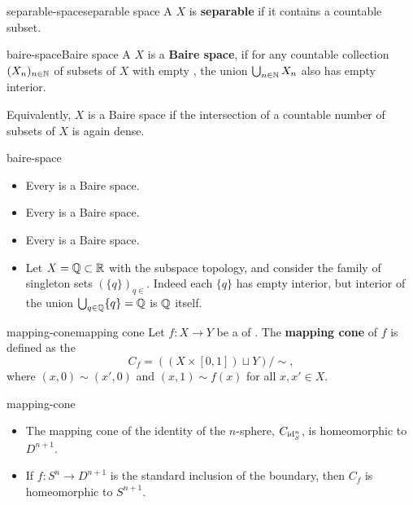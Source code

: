 \begin{topic}{separable-space}{separable space}
    A  $X$ is \textbf{separable} if it contains a countable  subset.
\end{topic}

\begin{topic}{baire-space}{Baire space}
    A  $X$ is a \textbf{Baire space}, if for any countable collection $(X_n)_{n \in \mathbb{N}}$ of subsets of $X$ with empty , the union $\bigcup_{n \in \mathbb{N}} X_n$ also has empty interior.
    
    Equivalently, $X$ is a Baire space if the intersection of a countable number of  subsets of $X$ is again dense.
\end{topic}

\begin{example}{baire-space}
    \begin{itemize}
        \item Every   is a Baire space.
        \item Every  is a Baire space.
        \item Every  is a Baire space.
        \item Let $X = \mathbb{Q} \subset \mathbb{R}$ with the subspace topology, and consider the family of singleton sets $(\{ q \})_{q \in }$. Indeed each $\{ q \}$ has empty interior, but interior of the union $\bigcup_{q \in \mathbb{Q}} \{ q \} = \mathbb{Q}$ is $\mathbb{Q}$ itself.
    \end{itemize}
\end{example}

\begin{topic}{mapping-cone}{mapping cone}
    Let $f \colon X \to Y$ be a  of . The \textbf{mapping cone} of $f$ is defined as the 
    \[ C_f = ( (X \times [0, 1]) \sqcup Y ) / \sim{} , \]
    where $(x, 0) \sim (x', 0)$ and $(x, 1) \sim f(x)$ for all $x, x' \in X$.
\end{topic}

\begin{example}{mapping-cone}
    \begin{itemize}
        \item The mapping cone of the identity of the $n$-sphere, $C_{\textup{id}_S^{n}}$, is homeomorphic to $D^{n + 1}$.
        \item If $f \colon S^n \to D^{n + 1}$ is the standard inclusion of the boundary, then $C_f$ is homeomorphic to $S^{n + 1}$.
    \end{itemize}
\end{example}

